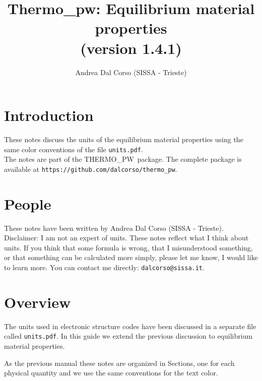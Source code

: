 \documentclass[12pt,a4paper]{article}
\def\version{1.4.1}
\def\tpw{{\sc THERMO\_PW}}
\begin{document}
 
\author{Andrea Dal Corso (SISSA - Trieste)}
\date{}


\title{
  \vskip 1cm
  {\color{red} \Huge Thermo\_pw: Equilibrium material properties} \\
  \Large (version \version)
}

\maketitle

\newpage

\tableofcontents

\newpage

\section{\color{coral}Introduction}
These notes discuss the units of the equilibrium material properties
using the same color conventions of the file \texttt{units.pdf}.\\
The notes are part of the \tpw\ package. The complete package is
available at \texttt{https://github.com/dalcorso/thermo\_pw}.


\newpage
\section{\color{coral}People}
These notes have been written by Andrea Dal Corso (SISSA - Trieste). \\
Disclaimer: I am not an expert of units. 
These notes reflect what I think about units.
If you think that some formula is wrong, that I misunderstood something, or 
that something can be calculated more simply, please let me know, I would 
like to learn more. 
You can contact me directly: \texttt{dalcorso@sissa.it}. 

\newpage
\section{\color{coral}Overview}
The units used in electronic structure codes have been
discussed in a separate file called \texttt{units.pdf}. In this guide
we extend the previous discussion to equilibrium material properties.

As the previous manual these notes are organized in Sections, one for 
each physical quantity and we use the same conventions for the text color.
\end{document}

